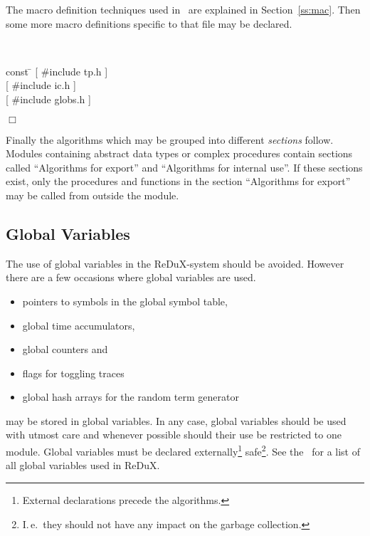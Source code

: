 The macro definition techniques used in \redux\ are explained in
Section~\ref{ss:mac}.
Then some more  macro definitions specific to that file may be declared.
\begin{example}  \null \\
 \begin{tabbing}
const \= \kill
{[ \#include tp.h ]} \\
{[ \#include ic.h ]} \\
{[ \#include globs.h ]} \\
\end{tabbing}
\hspace*{\fill} $\Box$
\end{example}
Finally the algorithms which may be grouped into different {\em sections}
follow.
Modules containing abstract data types or complex procedures contain
sections called ``Algorithms for export'' and ``Algorithms for internal use''.
If these sections exist, only the procedures and functions in the section 
``Algorithms for export'' may be called from outside the module.

\subsection{Global Variables} \label{ss:gv}

The use of global variables in the ReDuX-system should be avoided.
However there are a few occasions where global variables are used.
\begin{itemize}
 \item pointers to symbols in the global symbol table,
 \item global time accumulators,
 \item global counters and
 \item flags for toggling traces
 \item global hash arrays for the random term generator
\end{itemize}
may be stored in global variables.
In any case, global variables should be used with utmost care and whenever
possible should their use be restricted to one module.
Global variables must be declared externally\footnote{External declarations
precede the algorithms.} safe\footnote{I.\,e.\ they should not have any
impact on the garbage collection.}.
See the \RIX\ for a list of 
all global variables used in ReDuX.

